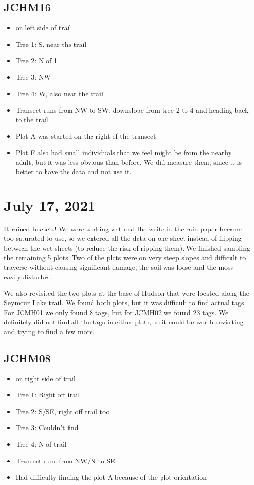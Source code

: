 \documentclass{article}\usepackage[]{graphicx}\usepackage[]{color}
\begin{document}
\subsection{JCHM16}
\begin{itemize}
\item on left side of trail
\item Tree 1: S, near the trail
\item Tree 2: N of 1
\item Tree 3: NW
\item Tree 4: W, also near the trail
\item Transect runs from NW to SW, downslope from tree 2 to 4 and heading back to the trail
\item Plot A was started on the right of the transect
\item Plot F also had small individuals that we feel might be from the nearby adult, but it was less obvious than before. We did measure them, since it is better to have the data and not use it.
\end{itemize}

\section{July 17, 2021}
It rained buckets! We were soaking wet and the write in the rain paper became too saturated to use, so we entered all the data on one sheet instead of flipping between the wet sheets (to reduce the risk of ripping them). We finished sampling the remaining 5 plots. Two of the plots were on very steep slopes and difficult to traverse without causing significant damage, the soil was loose and the moss easily disturbed. 

We also revisited the two plots at the base of Hudson that were located along the Seymour Lake trail. We found both plots, but it was difficult to find actual tags. For JCMH01 we only found 8 tags, but for JCMH02 we found 23 tags. We definitely did not find all the tags in either plots, so it could be worth revisiting and trying to find a few more.

\subsection{JCHM08}
\begin{itemize}
\item on right side of trail
\item Tree 1: Right off trail
\item Tree 2: S/SE, right off trail too
\item Tree 3: Couldn't find
\item Tree 4: N of trail
\item Transect runs from NW/N to SE 
\item Had difficulty finding the plot A because of the plot orientation
\end{itemize}
\end{document}
